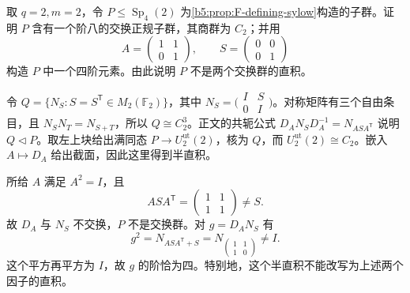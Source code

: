 \begin{exercise}\label{b5:ex:F-symplectic-sylow-four}
	取 \(q=2,m=2\)，令 \(P\le\operatorname{Sp}_4(2)\) 为\cref{b5:prop:F-defining-sylow}构造的子群。证明 \(P\) 含有一个阶八的交换正规子群，其商群为 \(C_2\)；并用
	\[
		A=\begin{pmatrix}1&1\\0&1\end{pmatrix},\qquad
		S=\begin{pmatrix}0&0\\0&1\end{pmatrix}
	\]
	构造 \(P\) 中一个四阶元素。由此说明 \(P\) 不是两个交换群的直积。
\end{exercise}
\begin{solution}
	令 \(Q=\{N_S:S=S^{\mathsf T}\in M_2(\mathbb F_2)\}\)，其中 \(N_S=\bigl(\begin{smallmatrix}I&S\\0&I\end{smallmatrix}\bigr)\)。对称矩阵有三个自由条目，且 \(N_SN_T=N_{S+T}\)，所以 \(Q\cong C_2^3\)。正文的共轭公式 \(D_AN_SD_A^{-1}=N_{ASA^{\mathsf T}}\) 说明 \(Q\triangleleft P\)。取左上块给出满同态 \(P\to U_2^{\mathrm{ut}}(2)\)，核为 \(Q\)，而 \(U_2^{\mathrm{ut}}(2)\cong C_2\)。嵌入 \(A\mapsto D_A\) 给出截面，因此这里得到半直积。

	所给 \(A\) 满足 \(A^2=I\)，且
	\[
		ASA^{\mathsf T}=\begin{pmatrix}1&1\\1&1\end{pmatrix}\ne S.
	\]
	故 \(D_A\) 与 \(N_S\) 不交换，\(P\) 不是交换群。对 \(g=D_AN_S\) 有
	\[
		g^2=N_{ASA^{\mathsf T}+S}
		=N_{\left(\begin{smallmatrix}1&1\\1&0\end{smallmatrix}\right)}\ne I.
	\]
	这个平方再平方为 \(I\)，故 \(g\) 的阶恰为四。特别地，这个半直积不能改写为上述两个因子的直积。
\end{solution}

